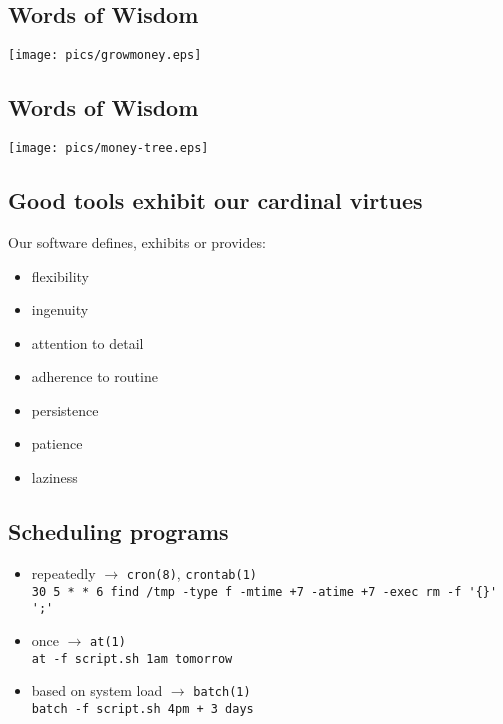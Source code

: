 \documentclass[xga]{xdvislides}
\begin{document}
\subsection{Words of Wisdom}
\vspace*{\fill}
\begin{center}
	\texttt{[image: pics/growmoney.eps]}
\end{center}
\vspace*{\fill}

\subsection{Words of Wisdom}
\vspace*{\fill}
\begin{center}
	\texttt{[image: pics/money-tree.eps]}
\end{center}
\vspace*{\fill}

\subsection{Good tools exhibit our cardinal virtues}
Our software defines, exhibits or provides:
\begin{itemize}
	\item flexibility
	\item ingenuity
	\item attention to detail
	\item adherence to routine
	\item persistence
	\item patience
	\item laziness
\end{itemize}

\subsection{Scheduling programs}

\begin{itemize}
	\item repeatedly $\rightarrow$ \verb+cron(8)+, \verb+crontab(1)+ \\
		\verb,30 5 * * 6 find /tmp -type f -mtime +7 -atime +7 -exec rm -f '{}' ';',
	\item once $\rightarrow$ \verb+at(1)+ \\
		\verb,at -f script.sh 1am tomorrow,
	\item based on system load $\rightarrow$ \verb+batch(1)+ \\
		\verb,batch -f script.sh 4pm + 3 days,
\end{itemize}
\end{document}
